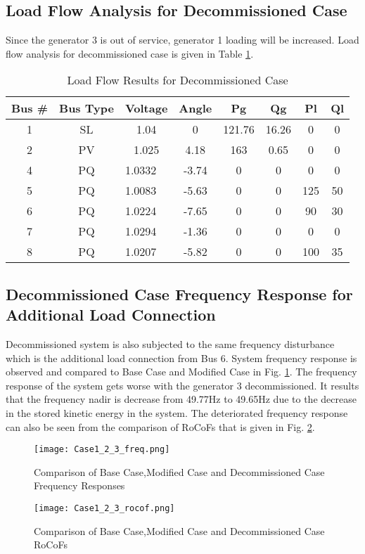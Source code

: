 \subsection{Load Flow Analysis for Decommissioned Case}
Since the generator 3 is out of service, generator 1 loading will be increased. Load flow analysis for decommissioned case is given in Table \ref{loadflow_case3}.
\begin{table}[h!]
	\centering
	\begin{tabular}{cclccccc}
		\hline
		Bus \# & Bus Type & \multicolumn{1}{c}{Voltage} & Angle & Pg    & Qg     & Pl  & Ql \\ \hline
		1      & SL       & \multicolumn{1}{c}{1.04}    & 0     & 121.76& 16.26  & 0   & 0  \\
		2      & PV       & \multicolumn{1}{c}{1.025}   & 4.18  & 163   & 0.65   & 0   & 0  \\
		4      & PQ       & 1.0332                      & -3.74 & 0     & 0      & 0   & 0  \\
		5      & PQ       & 1.0083                      & -5.63 & 0     & 0      & 125 & 50 \\
		6      & PQ       & 1.0224                      & -7.65 & 0     & 0      & 90  & 30 \\
		7      & PQ       & 1.0294                      & -1.36 & 0     & 0      & 0   & 0  \\
		8      & PQ       & 1.0207                      & -5.82 & 0     & 0      & 100 & 35 \\
 \hline
	\end{tabular}
	\caption{Load Flow Results for Decommissioned Case}
	\label{loadflow_case3}
\end{table}
\subsection{Decommissioned Case Frequency Response for Additional Load Connection}
Decommissioned system is also subjected to the same frequency disturbance which is the additional load connection from Bus 6. System frequency response is observed and compared to Base Case and Modified Case in Fig. \ref{Case1_2_3_freq}. The frequency response of the system gets worse with the generator 3 decommissioned. It results that the frequency nadir is decrease from 49.77Hz to 49.65Hz due to the decrease in the stored kinetic energy in the system. The deteriorated frequency response can also be seen from the comparison of RoCoFs that is given in Fig. \ref{Case1_2_3_rocof}. 
\begin{figure}[h]
	\centering
	\texttt{[image: Case1\_2\_3\_freq.png]}
	\caption{Comparison of Base Case,Modified Case and Decommissioned Case Frequency Responses}
	\label{Case1_2_3_freq}
\end{figure}
\begin{figure}[h]
	\centering
	\texttt{[image: Case1\_2\_3\_rocof.png]}
	\caption{Comparison of Base Case,Modified Case and Decommissioned Case RoCoFs}
	\label{Case1_2_3_rocof}
\end{figure}
